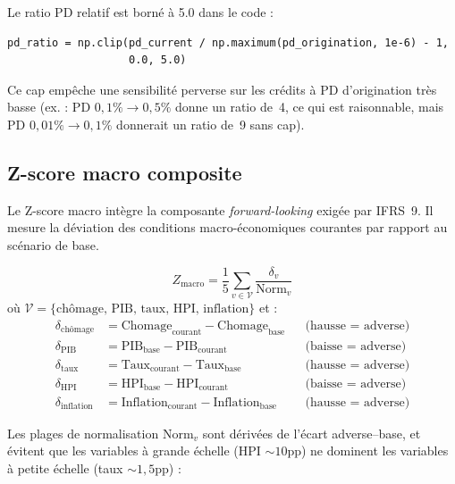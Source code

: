 \documentclass[12pt,a4paper]{article}
\begin{document}
\begin{warningbox}
Le ratio PD relatif est born\'e \`a 5.0 dans le code :
\begin{verbatim}
pd_ratio = np.clip(pd_current / np.maximum(pd_origination, 1e-6) - 1,
                   0.0, 5.0)
\end{verbatim}
Ce cap emp\^eche une sensibilit\'e perverse sur les cr\'edits \`a PD d'origination tr\`es basse (ex. : PD $0{,}1\% \to 0{,}5\%$ donne un ratio de~4, ce qui est raisonnable, mais PD $0{,}01\% \to 0{,}1\%$ donnerait un ratio de~9 sans cap).
\end{warningbox}

\subsection{Z-score macro composite}
\label{subsec:zscore}

Le Z-score macro int\`egre la composante \textit{forward-looking} exig\'ee par IFRS~9. Il mesure la d\'eviation des conditions macro-\'economiques courantes par rapport au sc\'enario de base.

\begin{formulebox}
\begin{equation}
\label{eq:zscore}
Z_{\text{macro}} = \frac{1}{5} \sum_{v \in \mathcal{V}} \frac{\delta_v}{\text{Norm}_v}
\end{equation}
o\`u $\mathcal{V} = \{\text{ch\^omage, PIB, taux, HPI, inflation}\}$ et :
\begin{align}
\delta_{\text{ch\^omage}} &= \text{Chomage}_{\text{courant}} - \text{Chomage}_{\text{base}} & &\text{(hausse = adverse)} \\
\delta_{\text{PIB}} &= \text{PIB}_{\text{base}} - \text{PIB}_{\text{courant}} & &\text{(baisse = adverse)} \\
\delta_{\text{taux}} &= \text{Taux}_{\text{courant}} - \text{Taux}_{\text{base}} & &\text{(hausse = adverse)} \\
\delta_{\text{HPI}} &= \text{HPI}_{\text{base}} - \text{HPI}_{\text{courant}} & &\text{(baisse = adverse)} \\
\delta_{\text{inflation}} &= \text{Inflation}_{\text{courant}} - \text{Inflation}_{\text{base}} & &\text{(hausse = adverse)}
\end{align}
\end{formulebox}

Les plages de normalisation $\text{Norm}_v$ sont d\'eriv\'ees de l'\'ecart adverse--base, et \'evitent que les variables \`a grande \'echelle (HPI $\sim 10$pp) ne dominent les variables \`a petite \'echelle (taux $\sim 1{,}5$pp) :
\end{document}
